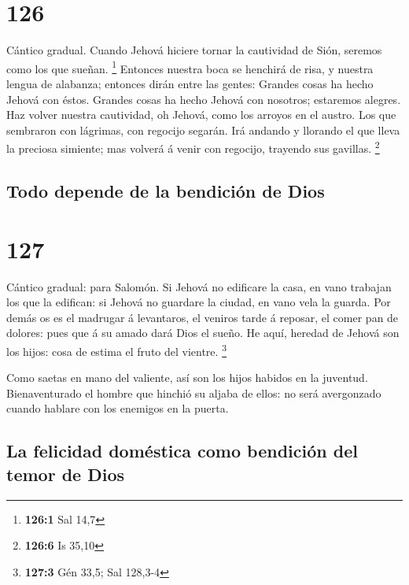 \hypertarget{section-125}{%
\section{126}\label{section-125}}

 Cántico gradual. Cuando Jehová hiciere tornar la cautividad
de Sión, seremos como los que sueñan. \footnote{\textbf{126:1} Sal 14,7}
 Entonces nuestra boca se henchirá de risa, y nuestra lengua
de alabanza; entonces dirán entre las gentes: Grandes cosas ha hecho
Jehová con éstos.  Grandes cosas ha hecho Jehová con
nosotros; estaremos alegres.  Haz volver nuestra cautividad,
oh Jehová, como los arroyos en el austro.  Los que sembraron
con lágrimas, con regocijo segarán.  Irá andando y llorando
el que lleva la preciosa simiente; mas volverá á venir con regocijo,
trayendo sus gavillas. \footnote{\textbf{126:6} Is 35,10}

\hypertarget{todo-depende-de-la-bendiciuxf3n-de-dios}{%
\subsection{Todo depende de la bendición de
Dios}\label{todo-depende-de-la-bendiciuxf3n-de-dios}}

\hypertarget{section-126}{%
\section{127}\label{section-126}}

 Cántico gradual: para Salomón. Si Jehová no edificare la
casa, en vano trabajan los que la edifican: si Jehová no guardare la
ciudad, en vano vela la guarda.  Por demás os es el madrugar
á levantaros, el veniros tarde á reposar, el comer pan de dolores: pues
que á su amado dará Dios el sueño.  He aquí, heredad de
Jehová son los hijos: cosa de estima el fruto del vientre. \footnote{\textbf{127:3}
  Gén 33,5; Sal 128,3-4}

 Como saetas en mano del valiente, así son los hijos habidos
en la juventud.  Bienaventurado el hombre que hinchió su
aljaba de ellos: no será avergonzado cuando hablare con los enemigos en
la puerta.

\hypertarget{la-felicidad-domuxe9stica-como-bendiciuxf3n-del-temor-de-dios}{%
\subsection{La felicidad doméstica como bendición del temor de
Dios}\label{la-felicidad-domuxe9stica-como-bendiciuxf3n-del-temor-de-dios}}


